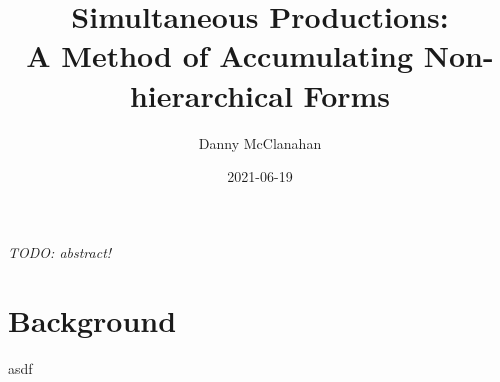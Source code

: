 \documentclass[10pt]{article}
\title{Simultaneous Productions: \\ A Method of Accumulating Non-hierarchical Forms}
\date{2021-06-19}
\author{Danny McClanahan}
\begin{document}
\maketitle

\textit{TODO: abstract!}

\tableofcontents

\section{Background}
\label{sec:background}

asdf
\end{document}
